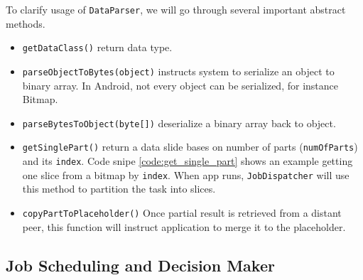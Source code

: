 \documentclass[conference]{IEEEtran}
\begin{document}
\noindent {}	

To clarify usage of \texttt{DataParser}, we will go through several important abstract methods.

\begin{itemize}
	\item \texttt{getDataClass()} return data type.
	\item \texttt{parseObjectToBytes(object)} instructs system to serialize an object to binary array. In Android, not every object can be serialized, for instance Bitmap.  
	\item \texttt{parseBytesToObject(byte[])} deserialize a binary array back to object.
	\item \texttt{getSinglePart()} return a data slide bases on number of parts (\texttt{numOfParts}) and its \texttt{index}. Code snipe \ref{code:get_single_part} shows an example getting one slice from a bitmap by \texttt{index}. When app runs, \texttt{JobDispatcher} will use this method to partition the task into slices.
	\item \texttt{copyPartToPlaceholder()} Once partial result is retrieved from a distant peer, this function will instruct application to merge it to the placeholder.
\end{itemize}


\subsection{Job Scheduling and Decision Maker} \label{scheduling}
\end{document}
